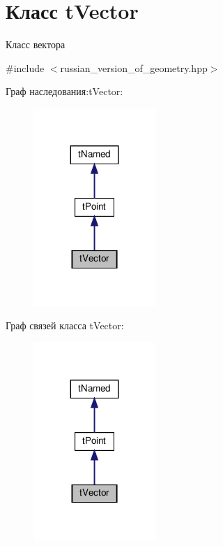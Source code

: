 \hypertarget{classtVector}{}\section{Класс t\+Vector}
\label{classtVector}


Класс вектора  




{\ttfamily \#include $<$russian\+\_\+version\+\_\+of\+\_\+geometry.\+hpp$>$}



Граф наследования\+:t\+Vector\+:\nopagebreak
\begin{figure}[H]
\begin{center}
\leavevmode
\includegraphics[width=131pt]{classtVector__inherit__graph}
\end{center}
\end{figure}


Граф связей класса t\+Vector\+:\nopagebreak
\begin{figure}[H]
\begin{center}
\leavevmode
\includegraphics[width=131pt]{classtVector__coll__graph}
\end{center}
\end{figure}
